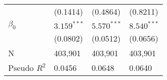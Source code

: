 \begin{tabular}{llll}
                                       &           (0.1414) &           (0.4864) &           (0.8211) \\
$\beta_0$                              &      $3.159^{***}$ &      $5.570^{***}$ &      $8.540^{***}$ \\
                                       &           (0.0802) &           (0.0512) &           (0.0656) \\
N                                      &            403,901 &            403,901 &            403,901 \\
Pseudo $R^2$                           &             0.0456 &             0.0648 &             0.0640 \\
\bottomrule
\end{tabular}
